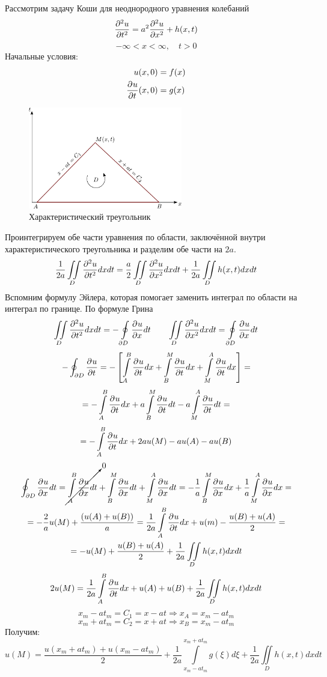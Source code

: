 Рассмотрим задачу Коши для неоднородного уравнения колебаний
\[
	\frac{\partial^{2}u}{\partial t^{2}} = a^2 \frac{\partial^{2}u}{\partial x^{2}} + h(x, t)
\]
\[
		-\infty < x < \infty,	\quad	t > 0
\]
Начальные условия:
\begin{alignat*}{1}
	u(x, 0) &= f(x)\\
	\frac{\partial^{}u}{\partial t^{}} (x, 0) &= g(x)
\end{alignat*}

\begin{figure}[h!] 
	\centering 
	\includegraphics[width=0.6\textwidth]{figStringKoshi.pdf}
	\caption{Характеристический треугольник}
\end{figure}
Проинтегрируем обе части уравнения по области, заключённой внутри характеристического треугольника и разделим обе части на $2 a$.
\[
	\frac{1}{2a} \iint\limits_D \frac{\partial^{2}u}{\partial t^{2}} dx dt = \frac{a}{2} \iint\limits_D \frac{\partial^{2}u}{\partial x^{2}} dx dt + \frac{1}{2 a} \iint\limits_D h(x, t) dx dt
\]
Вспомним формулу Эйлера, которая помогает заменить интеграл по области на интеграл по границе.
По формуле Грина 
\[
	\iint\limits_D \frac{\partial^{2}u}{\partial t^{2}} dxdt = - \oint\limits_{\partial D} \frac{\partial^{}u}{\partial x^{}} dt \qquad \iint\limits_D \frac{\partial^{2}u}{\partial x^{2}} dx dt = \oint\limits_{\partial D} \frac{\partial^{}u}{\partial x^{}} dt
\]
\[
	- \oint_{\partial D} \frac{\partial^{}u}{\partial t^{}} = - \left[ \int\limits_A^B \frac{\partial^{}u}{\partial t^{}} dx + \int\limits_B^M \frac{\partial^{}u}{\partial t^{}} dx + \int\limits_M^A \frac{\partial^{}u}{\partial t^{}} dx \right] = 
\]
\[ 
	= - \int\limits_A^B \frac{\partial^{}u}{\partial t^{}} dx + a \int\limits_B^M \frac{\partial^{}u}{\partial t^{}} dt - a \int\limits_M^A \frac{\partial^{}u}{\partial t^{}} dt = 
\]
\[ 
	= - \int\limits_A^B \frac{\partial^{}u}{\partial t^{}} dx + 2 a u(M) - a u(A) - a u(B)
\]
\begin{multline*}
	\oint_{\partial D} \frac{\partial^{}u}{\partial x^{}} dt = \cancelto{0}{\int\limits_A^B \frac{\partial^{}u}{\partial x^{}} dt} + \int\limits_B^M \frac{\partial^{}u}{\partial x^{}} dt + \int\limits_M^A \frac{\partial^{}u}{\partial x^{}} dt = - \frac{1}{a} \int\limits_B^M \frac{\partial^{}u}{\partial x^{}} dx + \frac{1}{a} \int\limits_M^A \frac{\partial^{}u}{\partial x^{}} dx = \\ 
	=- \frac{2}{a} u(M) + \frac{(u(A) +u(B))}{a} = \frac{1}{2 a} \int\limits_A^B \frac{\partial^{}u}{\partial t^{}} dx + u(m) - \frac{u(B) +u(A)}{2} =\\=
	 - u(M) + \frac{u(B)+u(A)}{2}  + \frac{1}{2a} \iint\limits_D h(x, t) dx dt
\end{multline*}
\[
	2 u(M) = \frac{1}{2a} \int\limits_A^B \frac{\partial^{}u}{\partial t^{}} dx + u(A) +u(B) + \frac{1}{2a} \iint\limits_D h(x, t) dx dt
\]
\[
	x_m - at_m = C_1 = x - at \Rightarrow x_A = x_m - at_m
\]
\[
	x_m + at_m = C_2 = x + at \Rightarrow x_B = x_m - at_m
\]
Получим:
\[
	u(M) = \frac{u(x_m +at_m) + u(x_m - a t_m)}{2} + \frac{1}{2a} \int\limits_{x_m - at_m}^{x_m + a t_m} g(\xi) d \xi + \frac{1}{2a} \iint\limits_D h(x, t) dx dt
\]



